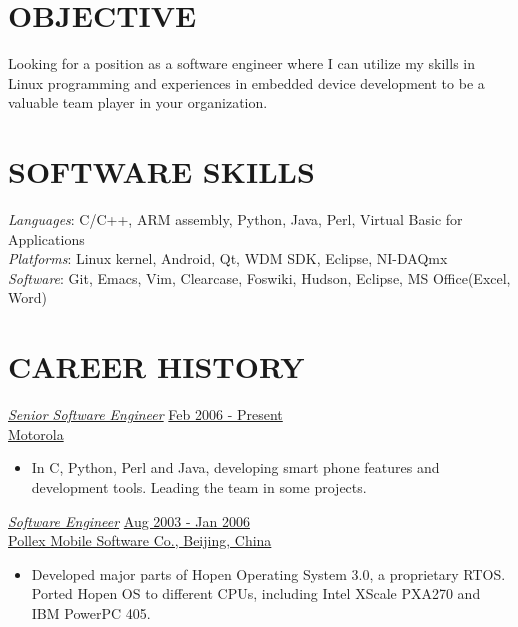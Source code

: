 \documentclass{res}
\begin{document}
\thispagestyle{empty} %

\address{386 Paddock Drive West, Savoy, IL 61874\\
  (217)898-3636\\
  pengliu2@illinois.edu}

\begin{resume}
\vspace{0.1in}

\section{OBJECTIVE}
\vspace{0.1in}
Looking for a position as a software engineer where I can utilize my skills in Linux programming and experiences in embedded device development to be a valuable team player in your organization.

\section{SOFTWARE SKILLS}
\vspace{0.1in}

        {\sl Languages}: C/C++, ARM assembly, Python, Java, Perl, Virtual Basic for Applications\\
        {\sl Platforms}: Linux kernel, Android, Qt, WDM SDK, Eclipse, NI-DAQmx\\
        {\sl Software}: Git, Emacs, Vim, Clearcase, Foswiki, Hudson, Eclipse, MS Office(Excel, Word)

\section{CAREER HISTORY}
	\uline{{\sl Senior Software Engineer}} \hfill \uline{Feb 2006 - Present}\\
        \uline{Motorola}
	\begin{itemize}
        \item In C, Python, Perl and Java, developing smart phone features and development tools. Leading the team in some projects.
	\end{itemize}

        \uline{{\sl Software Engineer}} \hfill                  \uline{Aug 2003 - Jan 2006}\\
        \uline{Pollex Mobile Software Co., Beijing, China}
	\begin{itemize}
        \item Developed major parts of Hopen Operating System 3.0, a proprietary RTOS. Ported Hopen OS to different CPUs, including Intel XScale PXA270 and IBM PowerPC 405. 
	\end{itemize}


\end{resume}
\end{document}
